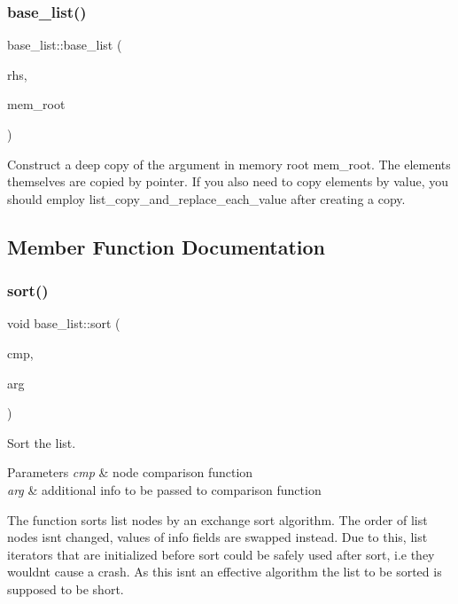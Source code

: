 \subsubsection{\texorpdfstring{base\+\_\+list()}{base\_list()}\hspace{0.1cm}{\footnotesize\ttfamily [2/2]}}
{\footnotesize\ttfamily base\+\_\+list\+::base\+\_\+list (\begin{DoxyParamCaption}\item[{const \mbox{\hyperlink{classbase__list}{base\+\_\+list}} \&}]{rhs,  }\item[{M\+E\+M\+\_\+\+R\+O\+OT $\ast$}]{mem\+\_\+root }\end{DoxyParamCaption})}

Construct a deep copy of the argument in memory root mem\+\_\+root. The elements themselves are copied by pointer. If you also need to copy elements by value, you should employ list\+\_\+copy\+\_\+and\+\_\+replace\+\_\+each\+\_\+value after creating a copy. 

\subsection{Member Function Documentation}
\mbox{\label{classbase__list_a6248247a8f1560022bfae0327076dc1b}} 
\subsubsection{\texorpdfstring{sort()}{sort()}}
{\footnotesize\ttfamily void base\+\_\+list\+::sort (\begin{DoxyParamCaption}\item[{Node\+\_\+cmp\+\_\+func}]{cmp,  }\item[{void $\ast$}]{arg }\end{DoxyParamCaption})\hspace{0.3cm}{\ttfamily [inline]}}



Sort the list. 


\begin{DoxyParams}{Parameters}
{\em cmp} & node comparison function \\
\hline
{\em arg} & additional info to be passed to comparison function\\
\hline
\end{DoxyParams}
The function sorts list nodes by an exchange sort algorithm. The order of list nodes isn\textquotesingle{}t changed, values of info fields are swapped instead. Due to this, list iterators that are initialized before sort could be safely used after sort, i.\+e they wouldn\textquotesingle{}t cause a crash. As this isn\textquotesingle{}t an effective algorithm the list to be sorted is supposed to be short. \mbox{\label{classbase__list_a5f4318d70a12a85932c5daacf0015f73}} 
